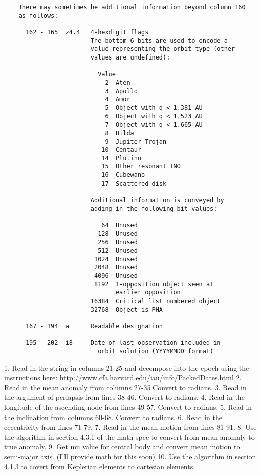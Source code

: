 \begin{verbatim}
    There may sometimes be additional information beyond column 160
    as follows:

      162 - 165  z4.4   4-hexdigit flags
                        The bottom 6 bits are used to encode a
                        value representing the orbit type (other
                        values are undefined):

                          Value
                            2  Aten
                            3  Apollo
                            4  Amor
                            5  Object with q < 1.381 AU
                            6  Object with q < 1.523 AU
                            7  Object with q < 1.665 AU
                            8  Hilda
                            9  Jupiter Trojan
                           10  Centaur
                           14  Plutino
                           15  Other resonant TNO
                           16  Cubewano
                           17  Scattered disk

                        Additional information is conveyed by
                        adding in the following bit values:

                           64  Unused
                          128  Unused
                          256  Unused
                          512  Unused
                         1024  Unused
                         2048  Unused
                         4096  Unused
                         8192  1-opposition object seen at
                               earlier opposition
                        16384  Critical list numbered object
                        32768  Object is PHA

      167 - 194  a      Readable designation

      195 - 202  i8     Date of last observation included in
                          orbit solution (YYYYMMDD format)

\end{verbatim}

 1.  Read in the string in columns 21-25 and decompose into the epoch using the instructions here:  http://www.cfa.harvard.edu/iau/info/PackedDates.html
 2.  Read in the mean anomaly from columns 27-35  Convert to radians.
 3.  Read in the argument of periapsis from lines 38-46.  Convert to radians.
 4.  Read in the longitude of the ascending node from lines 49-57.  Convert to radians.
 5.  Read in the inclination from columns 60-68.  Convert to radians.
 6.  Read in the eccentricity from lines 71-79.
 7.  Read in the mean motion from lines 81-91.
 8.  Use the algorithm in section 4.3.1 of the math spec to convert from mean anomaly to true anomaly.
 9.  Get mu value for central body and convert mean motion to semi-major axis. (I'll provide math for this soon)
 10. Use the algorithm in section 4.1.3 to covert from Keplerian elements to cartesian elements.


